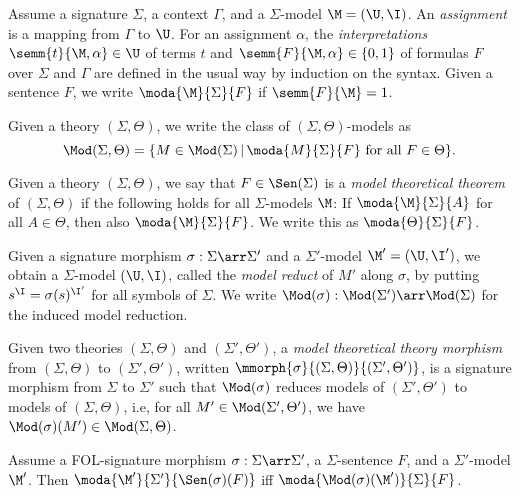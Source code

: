 \documentclass{elsarticle}
\begin{document}
\begin{bnf}
{{\begin{definition}\label{def:semantics}
Assume a signature $\Sigma$, a context $\Gamma$, and a $\Sigma$-model $\M=(\U,\I)$. An \emph{assignment} is a mapping from $\Gamma$ to $\U$. For an assignment $\alpha$, the \emph{interpretations} $\semm{t}{\M,\alpha}\in\U$ of terms $t$ and $\semm{F}{\M,\alpha}\in\{0,1\}$ of formulas $F$ over $\Sigma$ and $\Gamma$ are defined in the usual way by induction on the syntax.
Given a sentence $F$, we write $\moda{\M}{\Sigma}{F}$ if $\semm{F}{\M}=1$.

Given a theory $(\Sigma,\Theta)$, we write the class of $(\Sigma,\Theta)$-models as
\[\Mod(\Sigma,\Theta) = \{M\in \Mod(\Sigma)\,|\,\moda{M}{\Sigma}{F} \textrm{ for all } F\in\Theta\}.\]
\end{definition}

\begin{definition}
Given a theory $(\Sigma,\Theta)$, we say that $F\in\Sen(\Sigma)$ is a \emph{model theoretical theorem} of $(\Sigma,\Theta)$ if the following holds for all $\Sigma$-models $\M$: If $\moda{\M}{\Sigma}{A}$ for all $A\in\Theta$, then also $\moda{\M}{\Sigma}{F}$. We write this as $\moda{\Theta}{\Sigma}{F}$.
\end{definition}

\begin{definition}
Given a signature morphism $\sigma:\Sigma\arr\Sigma'$ and a $\Sigma'$-model $\M'=(\U,\I')$, we obtain a $\Sigma$-model $(\U,\I)$, called the \emph{model reduct} of $M'$ along $\sigma$, by putting $s^{\I}=\sigma(s)^{\I'}$ for all symbols of $\Sigma$. We write $\Mod(\sigma):\Mod(\Sigma')\arr\Mod(\Sigma)$ for the induced model reduction.
\end{definition}

\begin{definition}
Given two theories $(\Sigma,\Theta)$ and $(\Sigma',\Theta')$, a \emph{model theoretical theory morphism} from $(\Sigma,\Theta)$ to $(\Sigma',\Theta')$, written  $\mmorph{\sigma}{(\Sigma,\Theta)}{(\Sigma',\Theta')}$, is a signature morphism from $\Sigma$ to $\Sigma'$ such that $\Mod(\sigma)$ reduces models of $(\Sigma',\Theta')$ to models of $(\Sigma,\Theta)$, i.e, for all $M'\in \Mod(\Sigma',\Theta')$, we have $\Mod(\sigma)(M')\in\Mod(\Sigma,\Theta)$.
\end{definition}

\begin{lemma}
Assume a FOL-signature morphism\linebreak 
$\sigma:\Sigma\arr\Sigma'$, a $\Sigma$-sentence $F$, and a $\Sigma'$-model $\M'$. Then $\moda{\M'}{\Sigma'}{\Sen(\sigma)(F)}$ iff $\moda{\Mod(\sigma)(\M')}{\Sigma}{F}$.
\end{lemma}

}}
\end{bnf}
\end{document}
